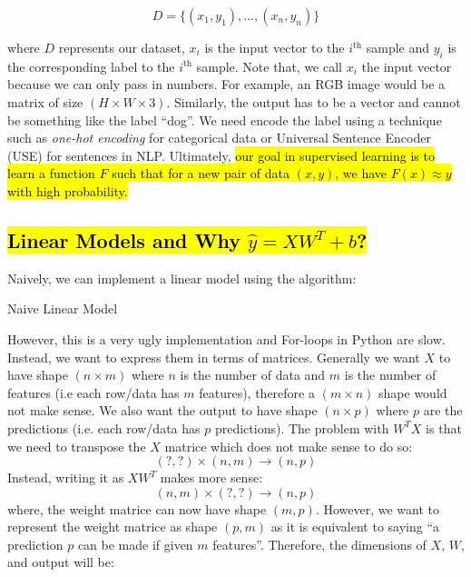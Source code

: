 \documentclass[11pt]{article}
\newcommand{\pluseq}{\mathrel{+}=}
\newcommand{\hlinfo}[1]{{\sethlcolor{lavender}\hl{#1}}}
\begin{document}
\[D= \{(x_1, y_1), ..., (x_n, y_n)\}\]

where $D$ represents our dataset, $x_i$ is the input vector to the $i^{\text{th}}$ sample and $y_i$ is the corresponding label to the $i^{\text{th}}$ sample. Note that, we call $x_i$ the input vector because we can only pass in numbers. For example, an RGB image would be a matrix of size $(H \times W \times 3)$. Similarly, the output has to be a vector and cannot be something like the label ``dog''. We need encode the label using a technique such as \emph{one-hot encoding} for categorical data or Universal Sentence Encoder (USE) for sentences in NLP. Ultimately, \hlinfo{our goal in supervised learning is to learn a function $F$ such that for a new pair of data $(x, y)$, we have $F(x) \approx y$ with high probability.}

\subsection{\hl{Linear Models and Why $\hat{y} = XW^{T} + b$?}}
\label{section:linearconvention}
Naively, we can implement a linear model using the algorithm:
\begin{algorithm}
    \caption{Naive Linear Model}
    \begin{algorithmic}[1]
            \State{$y \pluseq w_j \ast x_j$} 
        \EndFor
    \end{algorithmic}
\end{algorithm}

However, this is a very ugly implementation and For-loops in Python are slow. Instead, we want to express them in terms of matrices. Generally we want $X$ to have shape $(n \times m)$ where $n$ is the number of data and $m$ is the number of features (i.e each row/data has $m$ features), therefore a $(m \times n)$ shape would not make sense. We also want the output to have shape $(n \times p)$ where $p$ are the predictions (i.e. each row/data has $p$ predictions). The problem with $W^TX$ is that we need to transpose the $X$ matrice which does not make sense to do so:
\[(?, ?) \times (n, m) \rightarrow (n, p)\]
Instead, writing it as $XW^T$ makes more sense:
\[(n,m) \times (?,?) \rightarrow (n,p)\]
where, the weight matrice can now have shape $(m,p)$. However, we want to represent the weight matrice as shape $(p,m)$ as it is equivalent to saying ``a prediction $p$ can be made if given $m$ features''. Therefore, the dimensions of $X$, $W$, and output will be:
\end{document}
